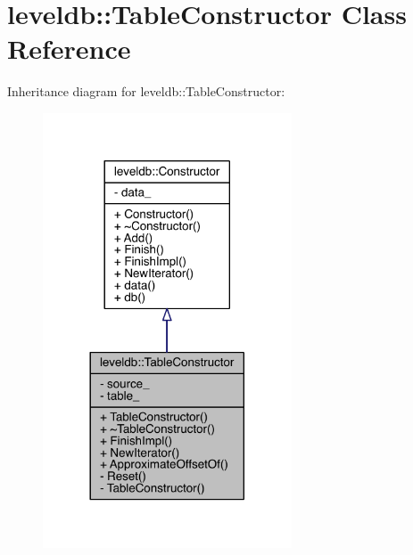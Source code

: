 \hypertarget{classleveldb_1_1_table_constructor}{}\section{leveldb\+:\+:Table\+Constructor Class Reference}
\label{classleveldb_1_1_table_constructor}


Inheritance diagram for leveldb\+:\+:Table\+Constructor\+:\nopagebreak
\begin{figure}[H]
\begin{center}
\leavevmode
\includegraphics[width=209pt]{classleveldb_1_1_table_constructor__inherit__graph}
\end{center}
\end{figure}


